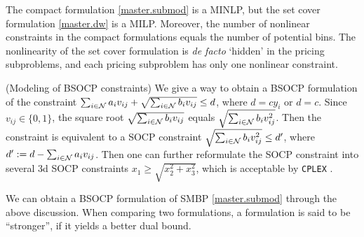 The compact formulation \eqref{master.submod} is a MINLP, but the set cover formulation \eqref{master.dw} is a MILP. Moreover, the number of nonlinear constraints in the compact formulations equals the number of potential bins. The nonlinearity of the set cover formulation is \textit{de facto} `hidden' in the pricing subproblems, and each pricing subproblem has only one nonlinear constraint.


\begin{remark}
\label{rm.bsocp}
(Modeling of BSOCP constraints)
We give a way to obtain a BSOCP formulation of the constraint $\sum_{i \in \mathcal N} a_i v_{ij} + \sqrt{\sum_{i \in \mathcal N} b_i v_{ij} } \le d$, where $d = c y_i$ or $d = c$. Since $v_{ij} \in \{0,1\}$, the square root $\sqrt{\sum_{i \in \mathcal N} b_i v_{ij} }$ equals  $\sqrt{\sum_{i \in \mathcal N} b_i v^2_{ij} }$. Then the constraint is equivalent to a SOCP constraint $ \sqrt{\sum_{i \in \mathcal N} b_i v^2_{ij} } \le d'$, where $d' := d - \sum_{i \in \mathcal N} a_i v_{ij}$. Then one can further reformulate the SOCP constraint into several 3d SOCP constraints $x_1 \ge \sqrt{x_2^2 +x_3^2}$, which is  acceptable by \texttt{CPLEX} \cite{bonami2015recent}.
\end{remark}

We can  obtain a BSOCP formulation of SMBP \eqref{master.submod} through the above discussion.
When comparing two formulations, a formulation is said to be ``stronger'', if it  yields a better dual bound.  

